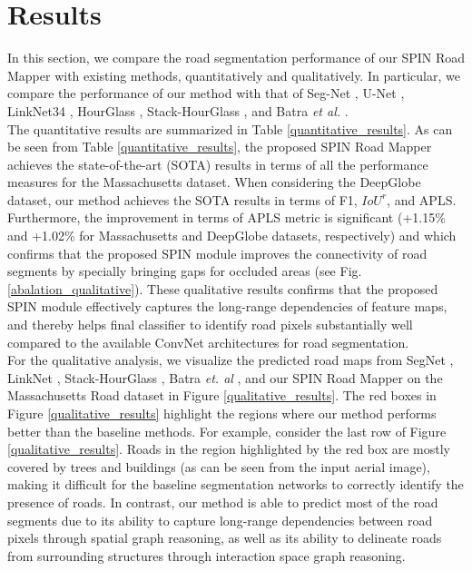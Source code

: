 \documentclass[letterpaper, 10 pt, conference]{ieeeconf}
\begin{document}
\section{Results}
In this section, we compare the road segmentation performance of our SPIN Road Mapper with existing methods, quantitatively and qualitatively.  In particular, we compare the performance of our method with that of Seg-Net \cite{badrinarayanan2017segnet}, U-Net \cite{ronneberger2015u}, LinkNet34 \cite{chaurasia2017linknet}, HourGlass \cite{newell2016stacked}, Stack-HourGlass \cite{newell2016stacked}, and Batra \textit{et al.} \cite{batra2019improved}.\\
 The quantitative results are summarized in Table \ref{quantitative_results}. As can be seen from Table \ref{quantitative_results}, the proposed SPIN Road Mapper achieves the state-of-the-art (SOTA) results in terms of all the performance measures for the Massachusetts dataset. When considering the DeepGlobe dataset, our method achieves the SOTA results in terms of F1, $IoU^r$, and APLS. Furthermore, the improvement in terms of APLS metric is significant (+1.15\% and +1.02\% for Massachusetts and DeepGlobe datasets, respectively) and which confirms that the proposed SPIN module improves the connectivity of road segments by specially bringing gaps for occluded areas (see Fig. \ref{abalation_qualitative}). These qualitative results confirms that the proposed SPIN module effectively captures the long-range dependencies of feature maps, and thereby helps final classifier to identify road pixels substantially well compared to the available ConvNet architectures for road segmentation.\\
 For the qualitative analysis, we visualize the predicted road maps from SegNet \cite{badrinarayanan2017segnet}, LinkNet \cite{chaurasia2017linknet}, Stack-HourGlass \cite{demir2018deepglobe}, Batra \textit{et. al} \cite{batra2019improved}, and our SPIN Road Mapper on the Massachusetts Road dataset in Figure \ref{qualitative_results}. The red boxes in Figure \ref{qualitative_results} highlight the regions where our method performs better than the baseline methods. For example, consider the last row of Figure \ref{qualitative_results}. Roads in the region highlighted by the red box are mostly covered by trees and buildings (as can be seen from the input aerial image), making it difficult for the baseline segmentation networks to correctly identify the presence of roads. In contrast, our method is able to predict most of the road segments due to its ability to capture long-range dependencies between road pixels through spatial graph reasoning, as well as its ability to delineate roads from surrounding structures through interaction space graph reasoning.\\
\end{document}
